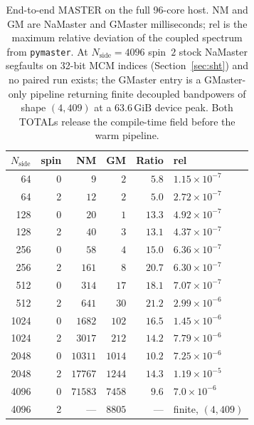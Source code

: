 \documentclass[usenatbib,useAMS]{mnras}
\begin{document}
\begin{table}
\centering
\setlength{\tabcolsep}{4pt}
\caption{End-to-end MASTER on the full 96-core host. NM and GM are NaMaster and GMaster milliseconds; rel is the maximum relative deviation of the coupled spectrum from \texttt{pymaster}. At $N_{\mathrm{side}}=4096$ spin~$2$ stock NaMaster segfaults on 32-bit MCM indices (Section~\ref{sec:sht}) and no paired run exists; the GMaster entry is a GMaster-only pipeline returning finite decoupled bandpowers of shape $(4,409)$ at a $63.6\,\mathrm{GiB}$ device peak. Both TOTALs release the compile-time field before the warm pipeline.}
\label{tab:e2e}
\small
\begin{tabular}{@{}rrrrrl@{}}
\toprule
$N_{\mathrm{side}}$ & spin & NM & GM & Ratio & rel \\
\midrule
64   & 0 & $9$     & $2$    & $5.8$  & $1.15\times10^{-7}$ \\
64   & 2 & $12$    & $2$    & $5.0$  & $2.72\times10^{-7}$ \\
128  & 0 & $20$    & $1$    & $13.3$ & $4.92\times10^{-7}$ \\
128  & 2 & $40$    & $3$    & $13.1$ & $4.37\times10^{-7}$ \\
256  & 0 & $58$    & $4$    & $15.0$ & $6.36\times10^{-7}$ \\
256  & 2 & $161$   & $8$    & $20.7$ & $6.30\times10^{-7}$ \\
512  & 0 & $314$   & $17$   & $18.1$ & $7.07\times10^{-7}$ \\
512  & 2 & $641$   & $30$   & $21.2$ & $2.99\times10^{-6}$ \\
1024 & 0 & $1682$  & $102$  & $16.5$ & $1.45\times10^{-6}$ \\
1024 & 2 & $3017$  & $212$  & $14.2$ & $7.79\times10^{-6}$ \\
2048 & 0 & $10311$ & $1014$ & $10.2$ & $7.25\times10^{-6}$ \\
2048 & 2 & $17767$ & $1244$ & $14.3$ & $1.19\times10^{-5}$ \\
4096 & 0 & $71583$ & $7458$ & $9.6$  & $7.0\times10^{-6}$ \\
4096 & 2 & ---     & $8805$ & ---    & finite, $(4,409)$ \\
\bottomrule
\end{tabular}
\end{table}
\end{document}
